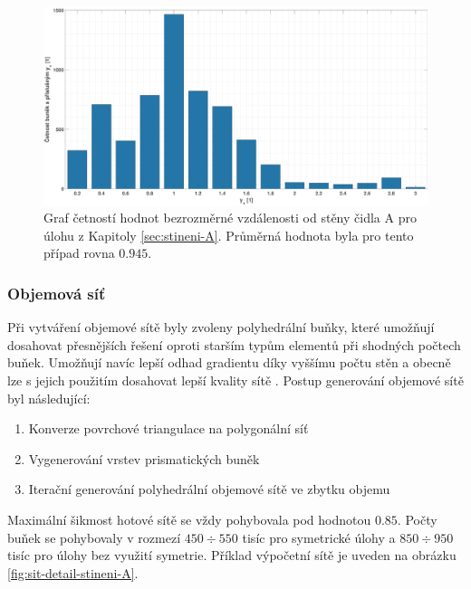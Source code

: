             \begin{figure}[ht!]
                \centering
                \includegraphics*[width=\textwidth  ]{300_VYPOCETNI_MODEL/yplus-stineni-A.eps}
                \caption{Graf četností hodnot bezrozměrné vzdálenosti od stěny čidla A pro úlohu z Kapitoly \ref{sec:stineni-A}. Průměrná hodnota byla pro tento případ rovna $0.945$.}
                \label{fig:yplus-stineni-A}
            \end{figure}

            \newpage


        \subsubsection{Objemová síť}

        Při vytváření objemové sítě byly zvoleny polyhedrální buňky, které umožňují dosahovat přesnějších řešení oproti starším typům elementů při shodných počtech buňek. Umožňují navíc lepší odhad gradientu díky vyššímu počtu stěn a obecně lze s jejich použitím dosahovat lepší kvality sítě \cite{Sosnowski2018}. Postup generování objemové sítě byl následující:

        \begin{enumerate}
            \item Konverze povrchové triangulace na polygonální síť
            \item Vygenerování vrstev prismatických buněk
            \item Iterační generování polyhedrální objemové sítě ve zbytku objemu
        \end{enumerate}

        Maximální šikmost hotové sítě se vždy pohybovala pod hodnotou $0.85$. Počty buňek se pohybovaly v rozmezí $450 \div 550$ tisíc pro symetrické úlohy a $850 \div 950$ tisíc pro úlohy bez využití symetrie. Příklad výpočetní sítě je uveden na obrázku \ref{fig:sit-detail-stineni-A}.

